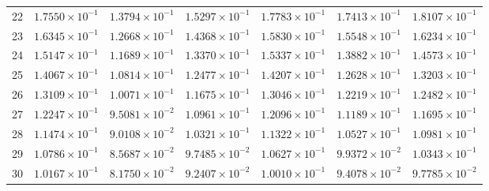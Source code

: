 \begin{table}[H]
\begin{tabular}{@{}rrrrrrr@{}}
22 & $1.7550\times10^{-1}$ & $1.3794\times10^{-1}$ & $1.5297\times10^{-1}$ & $1.7783\times10^{-1}$ & $1.7413\times10^{-1}$ & $1.8107\times10^{-1}$\\
23 & $1.6345\times10^{-1}$ & $1.2668\times10^{-1}$ & $1.4368\times10^{-1}$ & $1.5830\times10^{-1}$ & $1.5548\times10^{-1}$ & $1.6234\times10^{-1}$\\
24 & $1.5147\times10^{-1}$ & $1.1689\times10^{-1}$ & $1.3370\times10^{-1}$ & $1.5337\times10^{-1}$ & $1.3882\times10^{-1}$ & $1.4573\times10^{-1}$\\
25 & $1.4067\times10^{-1}$ & $1.0814\times10^{-1}$ & $1.2477\times10^{-1}$ & $1.4207\times10^{-1}$ & $1.2628\times10^{-1}$ & $1.3203\times10^{-1}$\\
26 & $1.3109\times10^{-1}$ & $1.0071\times10^{-1}$ & $1.1675\times10^{-1}$ & $1.3046\times10^{-1}$ & $1.2219\times10^{-1}$ & $1.2482\times10^{-1}$\\
27 & $1.2247\times10^{-1}$ & $9.5081\times10^{-2}$ & $1.0961\times10^{-1}$ & $1.2096\times10^{-1}$ & $1.1189\times10^{-1}$ & $1.1695\times10^{-1}$\\
28 & $1.1474\times10^{-1}$ & $9.0108\times10^{-2}$ & $1.0321\times10^{-1}$ & $1.1322\times10^{-1}$ & $1.0527\times10^{-1}$ & $1.0981\times10^{-1}$\\
29 & $1.0786\times10^{-1}$ & $8.5687\times10^{-2}$ & $9.7485\times10^{-2}$ & $1.0627\times10^{-1}$ & $9.9372\times10^{-2}$ & $1.0343\times10^{-1}$\\
30 & $1.0167\times10^{-1}$ & $8.1750\times10^{-2}$ & $9.2407\times10^{-2}$ & $1.0010\times10^{-1}$ & $9.4078\times10^{-2}$ & $9.7785\times10^{-2}$\\
\bottomrule
\end{tabular}
\end{table}

